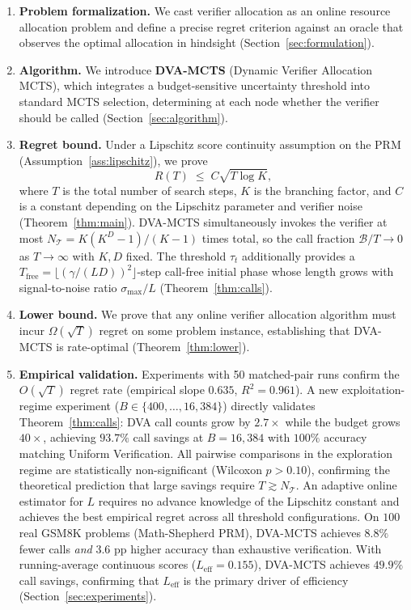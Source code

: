 \begin{enumerate}
  \item \textbf{Problem formalization.} We cast verifier allocation as an online
    resource allocation problem and define a precise regret criterion against an
    oracle that observes the optimal allocation in hindsight
    (Section~\ref{sec:formulation}).

  \item \textbf{Algorithm.} We introduce \textbf{DVA-MCTS} (Dynamic Verifier
    Allocation MCTS), which integrates a budget-sensitive uncertainty threshold
    into standard MCTS selection, determining at each node whether the verifier
    should be called (Section~\ref{sec:algorithm}).

  \item \textbf{Regret bound.} Under a Lipschitz score continuity assumption on
    the PRM (Assumption~\ref{ass:lipschitz}), we prove
    \[
      R(T) \;\leq\; C\sqrt{T \log K},
    \]
    where $T$ is the total number of search steps, $K$ is the branching factor,
    and $C$ is a constant depending on the Lipschitz parameter and verifier noise
    (Theorem~\ref{thm:main}). DVA-MCTS simultaneously invokes the verifier at most
    $N_{\mathcal{T}} = K(K^D-1)/(K-1)$ times total, so the call fraction $\mathcal{B}/T \to 0$
    as $T \to \infty$ with $K, D$ fixed. The threshold $\tau_t$ additionally
    provides a $T_{\mathrm{free}} = \lfloor(\gamma/(LD))^2\rfloor$-step call-free
    initial phase whose length grows with signal-to-noise ratio $\sigma_{\max}/L$
    (Theorem~\ref{thm:calls}).

  \item \textbf{Lower bound.} We prove that any online verifier allocation
    algorithm must incur $\Omega(\sqrt{T})$ regret on some problem instance,
    establishing that DVA-MCTS is rate-optimal (Theorem~\ref{thm:lower}).

  \item \textbf{Empirical validation.} Experiments with 50 matched-pair runs confirm
    the $O(\sqrt{T})$ regret rate (empirical slope $0.635$, $R^2 = 0.961$).
    A new exploitation-regime experiment ($B \in \{400, \ldots, 16{,}384\}$)
    directly validates Theorem~\ref{thm:calls}: DVA call counts grow by $2.7\times$
    while the budget grows $40\times$, achieving $\mathbf{93.7\%}$ call savings at
    $B{=}16{,}384$ with $100\%$ accuracy matching Uniform Verification.
    All pairwise comparisons in the exploration regime are statistically
    non-significant (Wilcoxon $p > 0.10$), confirming the theoretical prediction
    that large savings require $T \gtrsim N_{\mathcal{T}}$. An adaptive online estimator for $L$
    requires no advance knowledge of the Lipschitz constant and achieves the
    best empirical regret across all threshold configurations.  On $100$ real
    GSM8K problems (Math-Shepherd PRM), DVA-MCTS achieves $8.8\%$ fewer calls
    \emph{and} $3.6$ pp higher accuracy than exhaustive verification.
    With running-average continuous scores ($L_{\text{eff}}{=}0.155$), DVA-MCTS
    achieves $\mathbf{49.9\%}$ call savings, confirming that $L_{\text{eff}}$ is
    the primary driver of efficiency (Section~\ref{sec:experiments}).
\end{enumerate}

